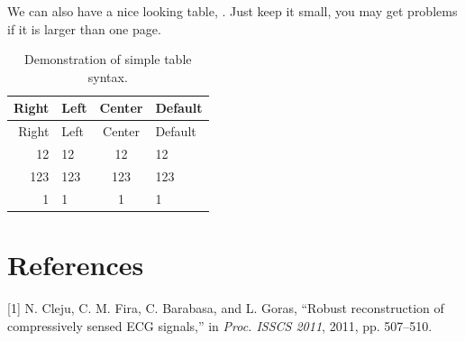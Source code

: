 \documentclass[conference,a4paper]{IEEEtran}
\begin{document}
We can also have a nice looking table, . Just keep it
small, you may get problems if it is larger than one page.

\hypertarget{tbl:simple}{}
\begin{longtable}[]{@{}rlcl@{}}
\caption{\label{tbl:simple}Demonstration of simple table
syntax.}\tabularnewline
\toprule
Right & Left & Center & Default\tabularnewline
\midrule
\endfirsthead
\toprule
Right & Left & Center & Default\tabularnewline
\midrule
\endhead
12 & 12 & 12 & 12\tabularnewline
123 & 123 & 123 & 123\tabularnewline
1 & 1 & 1 & 1\tabularnewline
\bottomrule
\end{longtable}

\hypertarget{references}{%
\section*{References}\label{references}}

\hypertarget{refs}{}
\leavevmode\hypertarget{ref-Cleju2011ISSCS}{}%
{[}1{]} N. Cleju, C. M. Fira, C. Barabasa, and L. Goras, ``Robust
reconstruction of compressively sensed ECG signals,'' in \emph{Proc.
ISSCS 2011}, 2011, pp. 507--510.

%
%
\end{document}
